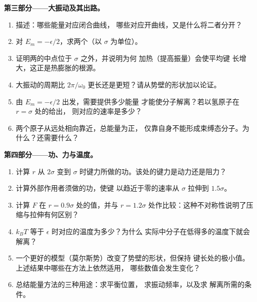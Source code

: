\begin{problem}
\medskip
\noindent\textbf{第三部分——大振动及其出路。}
\begin{enumerate}[resume]
  \item 描述：哪些能量对应闭合曲线，
        哪些对应开曲线，又是什么将二者分开？
  \item 对 $E_m = -\epsilon/2$，求两个（以
        $\sigma$ 为单位）。
  \item 证明两的中点位于 $\sigma$ 之外，并说明为何
        加热（提高振量）会使平均键
        长增大，这正是热膨胀的根源。
  \item 大振动的周期比
        $2\pi/\omega_0$ 更长还是更短？请从势壁的形状加以论证。
  \item 由 $E_m = -\epsilon/2$ 出发，需要提供多少能量
        才能使分子解离？若以氢原子在 $r = \sigma$ 处的给出，
        则对应的速率是多少？
  \item 两个原子从远处相向靠近，总能量为正，
        仅靠自身不能形成束缚态分子。为什么？还需要什么？
\end{enumerate}

\medskip
\noindent\textbf{第四部分——功、力与温度。}
\begin{enumerate}[resume]
  \item 计算 $r$ 从 $2\sigma$ 变到
        $\sigma$ 时键力所做的功。该处的键力是动力还是阻力？
  \item 计算外部作用者须做的功，使键
        以趋近于零的速率从 $\sigma$ 拉伸到 $1.5\sigma$。
  \item 计算 $F$ 在 $r = 0.9\sigma$ 处的值，并与
        $r = 1.2\sigma$ 处作比较：这种不对称性说明了压缩与拉伸有何区别？
  \item $k_BT$ 等于 $\epsilon$ 时对应的温度为多少？为什么
        实际中分子在低得多的温度下就会解离？
  \item 一个更好的模型（莫尔斯势）改变了势壁的形状，但保持
        键长处的极小值。上述结果中哪些在方法上依然适用，
        哪些数值会发生变化？
  \item 总结能量方法的三种用途：求平衡位置，
        求振动频率，以及求
        解离所需的条件。
\end{enumerate}
\end{problem}
